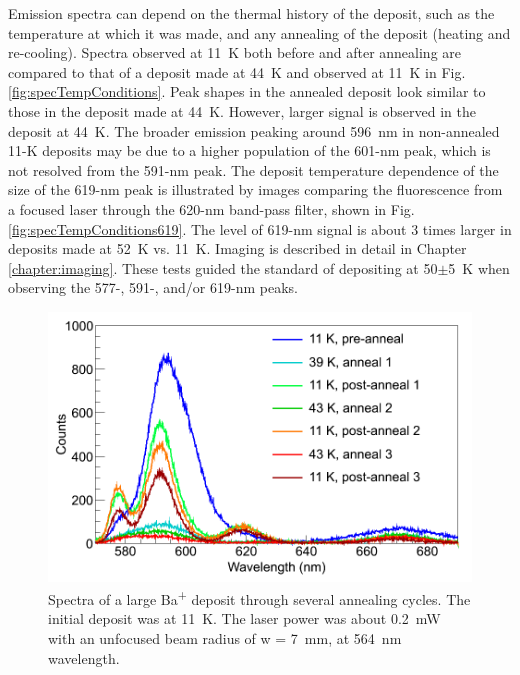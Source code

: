 Emission spectra can depend on the thermal history of the deposit, such as the temperature at which it was made, and any annealing of the deposit (heating and re-cooling).  Spectra observed at 11~K both before and after annealing are compared to that of a deposit  made at 44~K and observed at 11~K in Fig. \ref{fig:specTempConditions}.  Peak shapes in the annealed deposit look similar to those in the deposit made at 44~K.  However, larger signal is observed in the deposit at 44~K.  The broader emission peaking around 596~nm in non-annealed 11-K deposits may be due to a higher population of the 601-nm peak, which is not resolved from the 591-nm peak.  The deposit temperature dependence of the size of the 619-nm peak is illustrated by images comparing the fluorescence from a focused laser through the 620-nm band-pass filter, shown in Fig. \ref{fig:specTempConditions619}.  The level of 619-nm signal is about 3 times larger in deposits made at 52~K vs. 11~K.  Imaging is described in detail in Chapter \ref{chapter:imaging}.  These tests guided the standard of depositing at 50$\pm$5~K when observing the 577-, 591-, and/or 619-nm peaks.







\begin{figure} %
        \centering
                \includegraphics[width=.7\textwidth]{figures/spectra_annealing.png}
                \caption{Spectra of a large Ba\textsuperscript{+} deposit through several annealing cycles.  The initial deposit was at 11~K.  The laser power was about 0.2~mW with an unfocused beam radius of w = 7~mm, at 564~nm wavelength.  \cite{Mong2015}}
\label{fig:specAnneal}
\end{figure}

